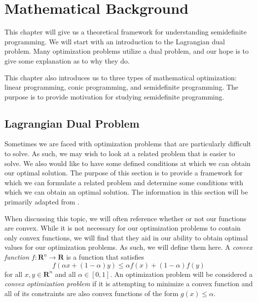 

	\chapter{Mathematical Background}		%
	\label{introchap}		%
	
	This chapter will give us a theoretical framework for understanding semidefinite programming. We will start with an introduction to the Lagrangian dual problem. Many optimization problems utilize a dual problem, and our hope is to give some explanation as to why they do. 
	
	This chapter also introduces us to three types of mathematical optimization: linear programming, conic programming, and semidefinite programming. The purpose is to provide motivation for studying semidefinite programming. 
	
	\section{Lagrangian Dual Problem}
	
	Sometimes we are faced with optimization problems that are particularly difficult to solve. As such, we may wish to look at a related problem that is easier to solve. We also would like to have some defined conditions at which we can obtain our optimal solution. The purpose of this section is to provide a framework for which we can formulate a related problem and determine some conditions with which we can obtain an optimal solution. The information in this section will be primarily adapted from \cite{boyd2004convex}.

	When discussing this topic, we will often reference whether or not our functions are convex. While it is not necessary for our optimization problems to contain only convex functions, we will find that they aid in our ability to obtain optimal values for our optimization problems. As such, we will define them here. A \emph{convex function} $f: \mathbf{R}^n \rightarrow \mathbf{R}$ is a function that satisfies
	$$
	f (\alpha x + (1 - \alpha) y) \leq \alpha f(x) + (1 - \alpha) f(y)
	$$
	for all $x,y \in \mathbf{R}^n$ and all $\alpha \in [0,1]$. An optimization problem will be considered a \emph{convex optimization problem} if it is attempting to minimize a convex function and all of its constraints are also convex functions of the form $g(x) \leq \alpha$. 
	
